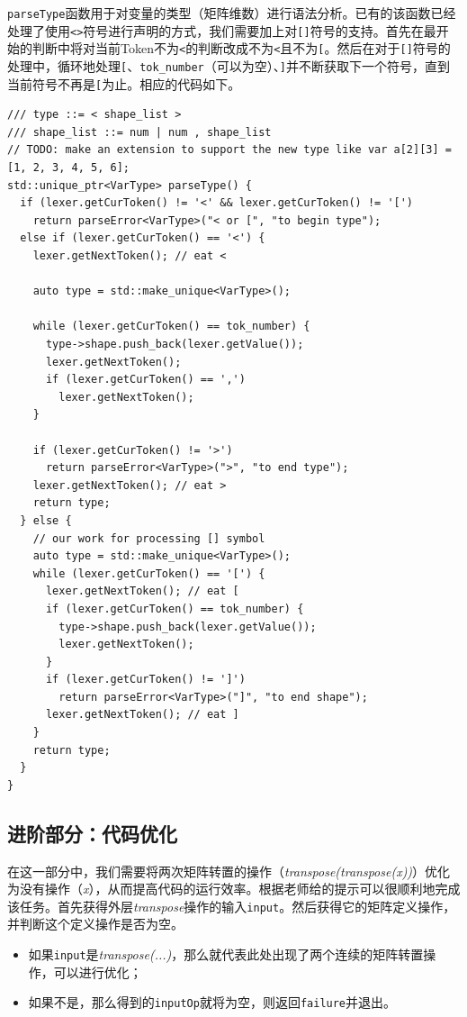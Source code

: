 \documentclass[lang=cn,11pt,a4paper]{elegantpaper}
\begin{document}
\texttt{parseType}函数用于对变量的类型（矩阵维数）进行语法分析。已有的该函数已经处理了使用\texttt{<>}符号进行声明的方式，我们需要加上对\texttt{[]}符号的支持。首先在最开始的判断中将对当前Token不为\texttt{<}的判断改成不为\texttt{<}且不为\texttt{[}。然后在对于\texttt{[]}符号的处理中，循环地处理\texttt{[}、\texttt{tok\_number}（可以为空）、\texttt{]}并不断获取下一个符号，直到当前符号不再是\texttt{[}为止。相应的代码如下。

\begin{lstlisting}
/// type ::= < shape_list >
/// shape_list ::= num | num , shape_list
// TODO: make an extension to support the new type like var a[2][3] = [1, 2, 3, 4, 5, 6];
std::unique_ptr<VarType> parseType() {
  if (lexer.getCurToken() != '<' && lexer.getCurToken() != '[')
    return parseError<VarType>("< or [", "to begin type");
  else if (lexer.getCurToken() == '<') {
    lexer.getNextToken(); // eat <

    auto type = std::make_unique<VarType>();

    while (lexer.getCurToken() == tok_number) {
      type->shape.push_back(lexer.getValue());
      lexer.getNextToken();
      if (lexer.getCurToken() == ',')
        lexer.getNextToken();
    }

    if (lexer.getCurToken() != '>')
      return parseError<VarType>(">", "to end type");
    lexer.getNextToken(); // eat >
    return type;
  } else {
    // our work for processing [] symbol
    auto type = std::make_unique<VarType>();
    while (lexer.getCurToken() == '[') {
      lexer.getNextToken(); // eat [
      if (lexer.getCurToken() == tok_number) {
        type->shape.push_back(lexer.getValue());
        lexer.getNextToken();
      }
      if (lexer.getCurToken() != ']')
        return parseError<VarType>("]", "to end shape");
      lexer.getNextToken(); // eat ]
    }
    return type;
  }
}
\end{lstlisting}


\subsection{进阶部分：代码优化}

在这一部分中，我们需要将两次矩阵转置的操作（\textit{transpose(transpose(x))}）优化为没有操作（\textit{x}），从而提高代码的运行效率。根据老师给的提示可以很顺利地完成该任务。首先获得外层\textit{transpose}操作的输入\texttt{input}。然后获得它的矩阵定义操作，并判断这个定义操作是否为空。

\begin{itemize}
  \item 如果\texttt{input}是\textit{transpose(...)}，那么就代表此处出现了两个连续的矩阵转置操作，可以进行优化；
  \item 如果不是，那么得到的\texttt{inputOp}就将为空，则返回\texttt{failure}并退出。
\end{itemize}
\end{document}
